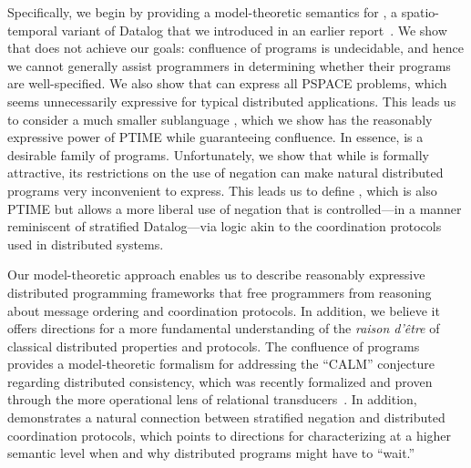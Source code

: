 Specifically, we begin by providing a model-theoretic semantics for \lang, a
spatio-temporal variant of Datalog that we introduced in an earlier
report~\cite{dedalus}.  We show that \lang does not achieve our goals:
confluence of \lang programs is undecidable, and hence we cannot generally
assist \lang programmers in determining whether their programs are
well-specified.  We also show that \lang can express all PSPACE problems, which seems
unnecessarily expressive for typical distributed applications.  This leads us to
consider a much smaller sublanguage \slang, which we show has the reasonably
expressive power of PTIME while guaranteeing confluence. In essence, \slang is a
desirable family of \lang programs.  Unfortunately, we show that while \slang is
formally attractive, its restrictions on the use of negation can make natural
distributed programs very inconvenient to express.  This leads us to define
\plang, which is also PTIME but allows a more liberal use of negation that is
controlled---in a manner reminiscent of stratified Datalog---via logic akin to
the coordination protocols used in distributed systems.


Our model-theoretic approach enables us to describe reasonably expressive distributed programming frameworks that free programmers from reasoning about message ordering and coordination protocols.  In addition, we believe it offers directions for a more fundamental understanding of the {\em raison d'\^{e}tre} of classical distributed properties and protocols.
The confluence of \slang programs provides a model-theoretic formalism for addressing the ``CALM'' conjecture~\cite{declarative-imperative} regarding distributed consistency, which was recently formalized and proven through the more operational lens of relational transducers~\cite{relational-transducers}.  In addition, \plang demonstrates a natural connection between stratified negation and distributed coordination protocols, which points to directions for characterizing at a higher semantic level when and why distributed programs might have to ``wait.''


